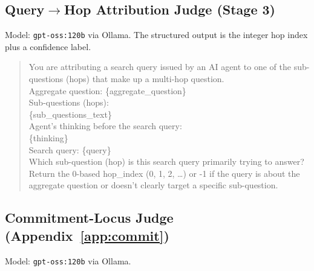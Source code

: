 \documentclass[10pt,letterpaper]{article}
\begin{document}
\subsection{Query$\to$Hop Attribution Judge (Stage 3)}
Model: \texttt{gpt-oss:120b} via Ollama. The structured output is the integer hop
index plus a confidence label.

\begin{quote}\sloppy\footnotesize\ttfamily
You are attributing a search query issued by an AI agent to one of the sub-questions
(hops) that make up a multi-hop question.\\[3pt]
Aggregate question: \{aggregate\_question\}\\[3pt]
Sub-questions (hops):\\
\{sub\_questions\_text\}\\[3pt]
Agent's thinking before the search query:\\
\{thinking\}\\[3pt]
Search query: \{query\}\\[3pt]
Which sub-question (hop) is this search query primarily trying to answer?\\
Return the 0-based hop\_index (0, 1, 2, \ldots) or -1 if the query is about the
aggregate question or doesn't clearly target a specific sub-question.
\end{quote}

\subsection{Commitment-Locus Judge (Appendix~\ref{app:commit})}
Model: \texttt{gpt-oss:120b} via Ollama.
\end{document}
